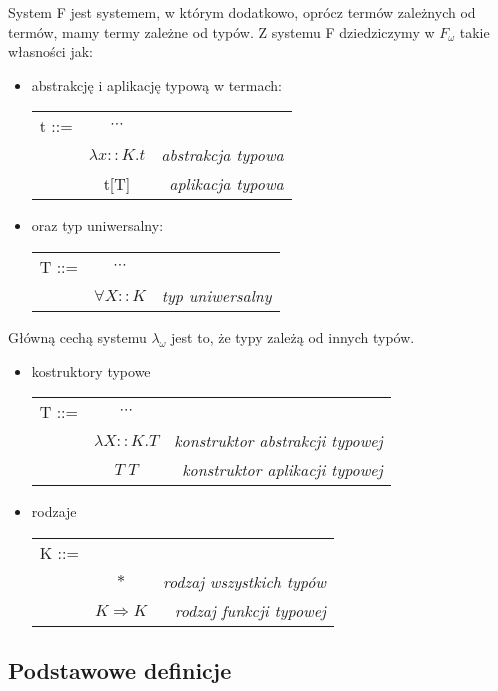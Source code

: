 \documentclass[11pt,leqno]{article}
\begin{document}
System F jest systemem, w którym dodatkowo, oprócz termów zależnych od termów, mamy termy zależne od typów. Z systemu F dziedziczymy w $F_{\omega}$ takie własności jak: 
\begin{itemize}
    \item abstrakcję i aplikację typową w termach: \\
\begin{tabular}{| l c r |}
  \hline
  t ::= & $\cdots$ &  \\
   & $\lambda x::K.t$ & \textit{abstrakcja typowa} \\
   & t[T] & \textit{aplikacja typowa} \\
  \hline
\end{tabular}

    \item  oraz typ uniwersalny: \\
\begin{tabular}{| l c r |}
  \hline
  T ::= & $\cdots$ &  \\
   & $\forall X::K$ & \textit{typ uniwersalny} \\
  \hline
\end{tabular}

\end{itemize}

Główną cechą systemu $\lambda_{\omega}$ jest to, że typy zależą od innych typów. 
\begin{itemize}
    \item kostruktory typowe \\
\begin{tabular}{| l c r |}
   \hline
   T ::= & $\cdots$ &  \\
   & $\lambda X::K.T$ & \textit{konstruktor abstrakcji typowej} \\
   & $T\;T$ & \textit{konstruktor aplikacji typowej} \\
   \hline
\end{tabular}
    \item rodzaje \\
\begin{tabular}{| l c r |}
  \hline
  K ::= &  &   \\
   & $\ast$ & \textit{rodzaj wszystkich typów} \\
   & $K \Rightarrow K$ & \textit{rodzaj funkcji typowej} \\
  \hline
\end{tabular}
\end{itemize} 

\subsection{Podstawowe definicje}
\end{document}
